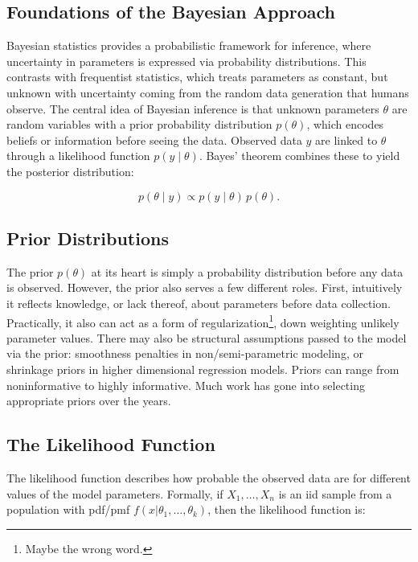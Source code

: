 \subsection{Foundations of the Bayesian Approach}
Bayesian statistics provides a probabilistic framework for inference, where uncertainty in parameters is expressed via probability distributions.  
This contrasts with frequentist statistics, which treats parameters as constant, but unknown with uncertainty coming from the random data generation that humans observe.  
The central idea of Bayesian inference is that unknown parameters \(\theta\) are random variables with a prior probability distribution \(p(\theta)\), which encodes beliefs or information before seeing the data.  
Observed data $y$ are linked to $\theta$ through a likelihood function $p(y \mid \theta)$.  
Bayes' theorem combines these to yield the posterior distribution:

\[
    p(\theta \mid y) \propto p(y \mid \theta)\, p(\theta).
\]

\subsection{Prior Distributions}
The prior $p(\theta)$ at its heart is simply a probability distribution before any data is observed.  
However, the prior also serves a few different roles.  
First, intuitively it reflects knowledge, or lack thereof, about parameters before data collection.  
Practically, it also can act as a form of regularization\footnote{Maybe the wrong word.}, down weighting unlikely parameter values.  
There may also be structural assumptions passed to the model via the prior: smoothness penalties in non/semi-parametric modeling, 
or shrinkage priors in higher dimensional regression models.  
Priors can range from noninformative to highly informative.  
Much work has gone into selecting appropriate priors over the years\cite{jaynes_prior_1968}\cite{van_erp_shrinkage_2019}\cite{kass_selection_1996}.

\subsection{The Likelihood Function}
The likelihood function describes how probable the observed data are for different values of the model parameters.  
Formally, if \(X_1,\dots, X_n\) is an iid sample from a population with pdf/pmf \(f(x|\theta_1,\dots,\theta_k)\), then the likelihood function is\cite{casella_statistical_2002}:

